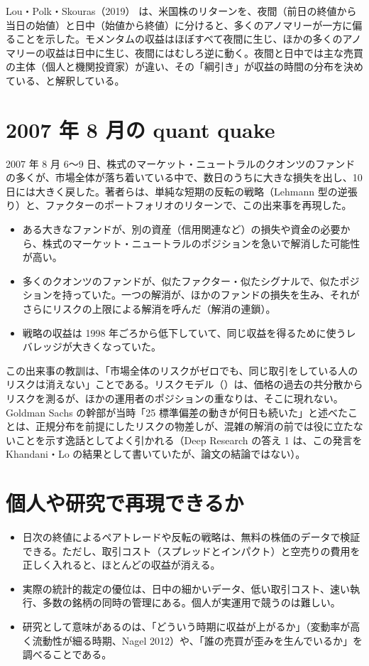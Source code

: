 Lou・Polk・Skouras（2019）\cite{lps2019} は、米国株のリターンを、夜間（前日の終値から当日の始値）と日中（始値から終値）に分けると、多くのアノマリーが一方に偏ることを示した。モメンタムの収益はほぼすべて夜間に生じ、ほかの多くのアノマリーの収益は日中に生じ、夜間にはむしろ逆に動く。夜間と日中では主な売買の主体（個人と機関投資家）が違い、その「綱引き」が収益の時間の分布を決めている、と解釈している。

\section{2007 年 8 月の quant quake}

\begin{paperbox}
2007 年 8 月 6〜9 日、株式のマーケット・ニュートラルのクオンツのファンドの多くが、市場全体が落ち着いている中で、数日のうちに大きな損失を出し、10 日には大きく戻した。著者らは、単純な短期の反転の戦略（Lehmann 型の逆張り）と、ファクターのポートフォリオのリターンで、この出来事を再現した。
\begin{itemize}
\item ある大きなファンドが、別の資産（信用関連など）の損失や資金の必要から、株式のマーケット・ニュートラルのポジションを急いで解消した可能性が高い。
\item 多くのクオンツのファンドが、似たファクター・似たシグナルで、似たポジションを持っていた。一つの解消が、ほかのファンドの損失を生み、それがさらにリスクの上限による解消を呼んだ（解消の連鎖）。
\item 戦略の収益は 1998 年ごろから低下していて、同じ収益を得るために使うレバレッジが大きくなっていた。
\end{itemize}
\end{paperbox}

この出来事の教訓は、「市場全体のリスクがゼロでも、同じ取引をしている人のリスクは消えない」ことである。リスクモデル（）は、価格の過去の共分散からリスクを測るが、ほかの運用者のポジションの重なりは、そこに現れない。Goldman Sachs の幹部が当時「25 標準偏差の動きが何日も続いた」と述べたことは、正規分布を前提にしたリスクの物差しが、混雑の解消の前では役に立たないことを示す逸話としてよく引かれる（Deep Research の答え 1 は、この発言を Khandani・Lo の結果として書いていたが、論文の結論ではない）。

\section{個人や研究で再現できるか}

\begin{itemize}
\item 日次の終値によるペアトレードや反転の戦略は、無料の株価のデータで検証できる。ただし、取引コスト（スプレッドとインパクト）と空売りの費用を正しく入れると、ほとんどの収益が消える。
\item 実際の統計的裁定の優位は、日中の細かいデータ、低い取引コスト、速い執行、多数の銘柄の同時の管理にある。個人が実運用で競うのは難しい。
\item 研究として意味があるのは、「どういう時期に収益が上がるか」（変動率が高く流動性が細る時期、Nagel 2012）や、「誰の売買が歪みを生んでいるか」を調べることである。
\end{itemize}
